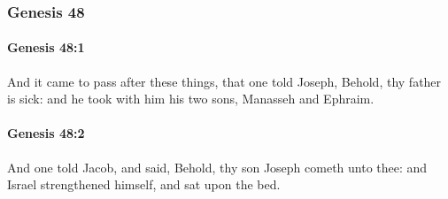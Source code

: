 	\subsubsection{Genesis 48} %
		\label{GENESIS-48}

		\paragraph{Genesis 48:1} %
			\label{GENESIS-48-1}

			And it came to pass after these things, that one told Joseph, Behold, thy father is sick: and he took with him his two sons, Manasseh and Ephraim.


		\paragraph{Genesis 48:2} %
			\label{GENESIS-48-2}

			And one told Jacob, and said, Behold, thy son Joseph cometh unto thee: and Israel strengthened himself, and sat upon the bed.

